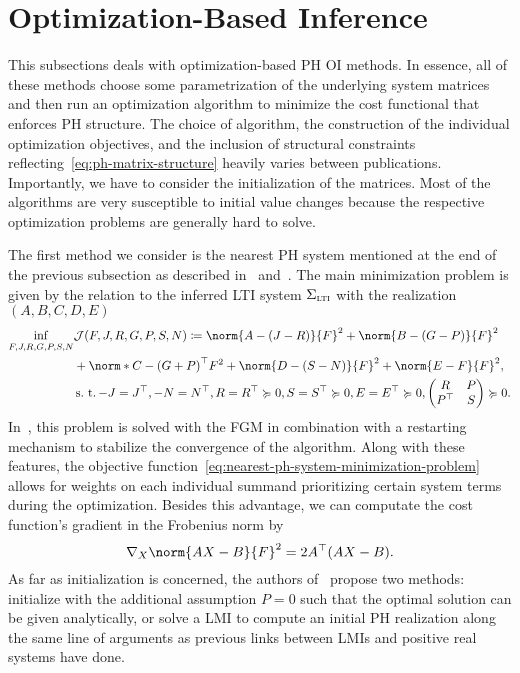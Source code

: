 \section{Optimization-Based Inference}\label{sec:optimization-based-inference}

This subsections deals with optimization-based \ac{PH} \ac{OI} methods.
In essence, all of these methods choose some parametrization of the underlying system matrices and then run an optimization algorithm to minimize the cost functional that enforces \ac{PH} structure.
The choice of algorithm, the construction of the individual optimization objectives, and the inclusion of structural constraints reflecting~\eqref{eq:ph-matrix-structure} heavily varies between publications.
Importantly, we have to consider the initialization of the matrices.
Most of the algorithms are very susceptible to initial value changes because the respective optimization problems are generally hard to solve.

The first method we consider is the nearest \ac{PH} system mentioned at the end of the previous subsection as described in~\cite{Gillis2018} and~\cite{Cherifi2019}.
The main minimization problem is given by the relation to the inferred \ac{LTI} system $\Sigma_{\textnormal{\scshape lti}}$ with the realization $(A, B, C, D, E)$
\begin{equation}\label{eq:nearest-ph-system-minimization-problem}
    \begin{alignedat}{4}
        \eqinf\limits_{F, J, R, G, P, S, N} &\mcl{J}(F, J, R, G, P, S, N) \coloneqq \norm{A - (J - R)}{F}^2 + \norm{B - (G - P)}{F}^2 \\
        &+ \norm*{C - {(G + P)}\trans}{F}^2 + \norm{D - (S - N)}{F}^2 + \norm{E - F}{F}^2, \\
        &\suchthat -J = J\trans, -N = N\trans, R = R\trans \succcurlyeq 0, S = S\trans \succcurlyeq 0, E = E\trans \succcurlyeq 0, \begin{pmatrix}
            R & P \\
            P\trans & S
        \end{pmatrix} \succcurlyeq 0.
    \end{alignedat}
\end{equation}
In~\cite{Gillis2018}, this problem is solved with the \ac{FGM} in combination with a restarting mechanism to stabilize the convergence of the algorithm.
Along with these features, the objective function~\eqref{eq:nearest-ph-system-minimization-problem} allows for weights on each individual summand prioritizing certain system terms during the optimization.
Besides this advantage, we can computate the cost function's gradient in the Frobenius norm by
\begin{equation*}
    \nabla_X \norm{A X - B}{F}^2 = 2 A\trans (A X - B).
\end{equation*}
As far as initialization is concerned, the authors of~\cite{Gillis2018} propose two methods: initialize with the additional assumption $P = 0$ such that the optimal solution can be given analytically, or solve a \ac{LMI} to compute an initial \ac{PH} realization along the same line of arguments as previous links between \acp{LMI} and positive real systems have done.

